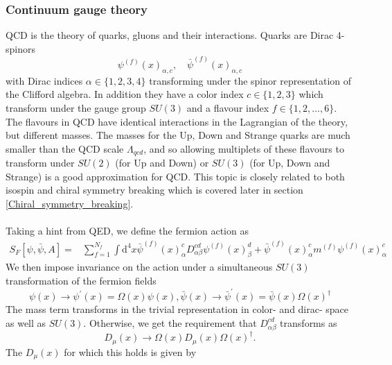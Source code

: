 \documentclass[a4paper,10pt]{article}
\begin{document}
\subsubsection{Continuum gauge theory}
QCD is the theory of quarks, gluons and their interactions. Quarks are Dirac 4- spinors 
\begin{equation}
\psi^{(f)}(x)_{\alpha, c}, \quad \bar{\psi}^{(f)}(x)_{\alpha, c}
\end{equation}
with Dirac indices $\alpha \in \{ 1,2,3,4\}$ transforming under the spinor representation of the Clifford algebra. In addition they have a color index $c \in \{ 1,2,3\}$ which transform under the gauge group $SU(3)$ and a flavour index $f \in \{ 1,2,\ldots ,6\}$. The flavours in QCD have identical interactions in the Lagrangian of the theory, but different masses. The masses for the Up, Down and Strange quarks are much smaller than the QCD scale $\Lambda_{qcd}$, and so allowing multiplets of these flavours to transform under $SU(2)$ (for Up and Down) or $SU(3)$ (for Up, Down and Strange) is a good approximation for QCD. This topic is closely related to both isospin and chiral symmetry breaking which is covered later in section \ref{Chiral_symmetry_breaking}.\\\\Taking a hint from QED, we define the fermion action as
\begin{equation}
\begin{aligned}
S_{F}[\psi, \bar{\psi}, A]=& \sum_{f=1}^{N_{f}} \int \mathrm{d}^{4} x \bar{\psi}^{(f)}(x)_{\alpha}^cD_{\alpha \beta}^{c d} \psi^{(f)}(x)_{\beta}^d +
\bar{\psi}^{(f)}(x)_{\alpha}^c m^{(f)} \psi^{(f)}(x)_{\alpha}^c
\end{aligned}
\end{equation}
We then impose invariance on the action under a simultaneous $SU(3)$ transformation of the fermion fields
\begin{equation}
\psi(x) \rightarrow \psi^{\prime}(x)=\Omega(x) \psi(x), \bar{\psi}(x) \rightarrow \bar{\psi}^{\prime}(x)=\bar{\psi}(x) \Omega(x)^{\dagger}
\end{equation}
The mass term transforms in the trivial representation in color- and dirac- space as well as $SU(3)$. Otherwise, we get the requirement that $D_{\alpha \beta}^{c d}$ transforms as
\begin{equation}\label{eq:covariant_derivative_transformation}
D_{\mu}(x) \rightarrow \Omega(x) D_{\mu}(x) \Omega(x)^{\dagger}.
\end{equation}
The $D_{\mu}(x)$ for which this holds is given by 
\end{document}
